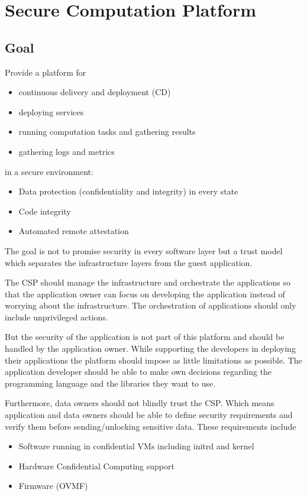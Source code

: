
\chapter{Secure Computation Platform}
\label{ch:proposal}

\section{Goal}

Provide a platform for
\begin{itemize}
  \item continuous delivery and deployment (CD)
  \item deploying services
  \item running computation tasks and gathering results
  \item gathering logs and metrics
\end{itemize}
in a secure environment:
\begin{itemize}
  \item Data protection (confidentiality and integrity) in every state
  \item Code integrity
  \item Automated remote attestation
\end{itemize}

The goal is not to promise security in every software layer but a trust model
which separates the infrastructure layers from the guest application.

The CSP should manage the infrastructure and orchestrate the applications so
that the application owner can focus on developing the application instead of
worrying about the infrastructure. The orchestration of applications should only
include unprivileged actions.

But the security of the application is not part of this platform and should be
handled by the application owner. While supporting the developers in deploying
their applications the platform should impose as little limitations as possible.
The application developer should be able to make own decisions regarding the
programming language and the libraries they want to use.

Furthermore, data owners should not blindly trust the CSP. Which means
application and data owners should be able to define security requirements and
verify them before sending/unlocking sensitive data. These requirements include
\begin{itemize}
  \item Software running in confidential VMs including initrd and kernel
  \item Hardware Confidential Computing support
  \item Firmware (OVMF)
\end{itemize}

